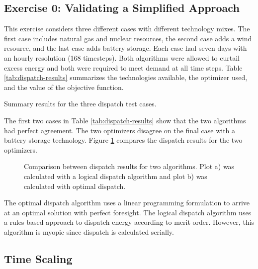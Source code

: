 \subsection{Exercise 0: Validating a Simplified Approach}

This exercise considers three different cases with different technology mixes. The first case
includes natural gas and nuclear resources, the second case adds a wind resource, and the last 
case adds battery storage. Each case had seven days with an hourly resolution (168 timesteps). Both
algorithms were allowed to curtail excess energy and both were required to meet demand at all time
steps. Table \ref{tab:dispatch-results} summarizes the technologies available, the optimizer used, 
and the value of the objective function. 

\begin{table}[htbp!]
    \centering
    \caption{Summary results for the three dispatch test cases.}
    \label{tab:dispatch-results}
    
\end{table}

\noindent
The first two cases in Table \ref{tab:dispatch-results} show that the two algorithms had perfect
agreement. The two optimizers disagree on the final case with a battery storage technology. Figure
\ref{fig:dispatch-comparison} compares the dispatch results for the two optimizers.


\begin{figure}
    \centering
    \resizebox{\columnwidth}{!}{}
    \caption{Comparison between dispatch results for two algorithms. Plot a) was calculated with a logical
    dispatch algorithm and plot b) was calculated with optimal dispatch.}
    \label{fig:dispatch-comparison}
\end{figure}

The optimal dispatch algorithm uses a linear programming formulation
to arrive at an optimal solution with perfect foresight. The logical dispatch algorithm
uses a rules-based approach to dispatch energy according to merit order. However, this
algorithm is myopic since dispatch is calculated serially.


\FloatBarrier

\subsection{Time Scaling}


